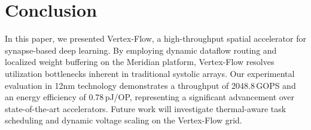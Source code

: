 \section{Conclusion}
\label{sec:conclusion}
In this paper, we presented Vertex-Flow, a high-throughput spatial accelerator for synapse-based deep learning. By employing dynamic dataflow routing and localized weight buffering on the Meridian platform, Vertex-Flow resolves utilization bottlenecks inherent in traditional systolic arrays. Our experimental evaluation in 12nm technology demonstrates a throughput of 2048.8\,GOPS and an energy efficiency of 0.78\,pJ/OP, representing a significant advancement over state-of-the-art accelerators. Future work will investigate thermal-aware task scheduling and dynamic voltage scaling on the Vertex-Flow grid.
